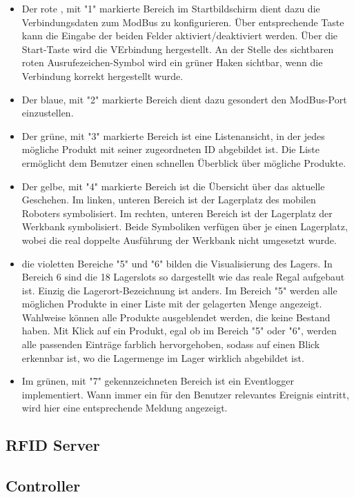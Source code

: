     \begin{itemize}
        \item Der rote , mit "1" markierte Bereich im Startbildschirm dient dazu die Verbindungsdaten zum ModBus zu konfigurieren. Über entsprechende Taste kann die Eingabe der beiden Felder aktiviert/deaktiviert werden. Über die Start-Taste wird die VErbindung hergestellt.
        An der Stelle des sichtbaren roten Ausrufezeichen-Symbol wird ein grüner Haken sichtbar, wenn die Verbindung korrekt hergestellt wurde.
        \item Der blaue, mit "2" markierte Bereich dient dazu gesondert den ModBus-Port einzustellen.
        \item Der grüne, mit "3" markierte Bereich ist eine Listenansicht, in der jedes mögliche Produkt mit seiner zugeordneten ID abgebildet ist.
        Die Liste ermöglicht dem Benutzer einen schnellen Überblick über mögliche Produkte.
        \item Der gelbe, mit "4" markierte Bereich ist die Übersicht über das aktuelle Geschehen. Im linken, unteren Bereich ist der Lagerplatz des mobilen Roboters symbolisiert.
        Im rechten, unteren Bereich ist der Lagerplatz der Werkbank symbolisiert. Beide Symboliken verfügen über je einen Lagerplatz, wobei die real doppelte Ausführung der Werkbank nicht umgesetzt wurde.
        \item die violetten Bereiche "5" und "6" bilden die Visualisierung des Lagers. In Bereich 6 sind die 18 Lagerslots so dargestellt wie das reale Regal aufgebaut ist. Einzig die Lagerort-Bezeichnung ist anders.
        Im Bereich "5" werden alle möglichen Produkte in einer Liste mit der gelagerten Menge angezeigt. Wahlweise können alle Produkte ausgeblendet werden, die keine Bestand haben.
        Mit Klick auf ein Produkt, egal ob im Bereich "5" oder "6", werden alle passenden Einträge farblich hervorgehoben, sodass auf einen Blick erkennbar ist, wo die Lagermenge im Lager wirklich abgebildet ist.
        \item Im grünen, mit "7" gekennzeichneten Bereich ist ein Eventlogger implementiert. Wann immer ein für den Benutzer relevantes Ereignis eintritt, wird hier eine entsprechende Meldung angezeigt.
    \end{itemize}


    \subsection {RFID Server}

    \subsection {Controller}

